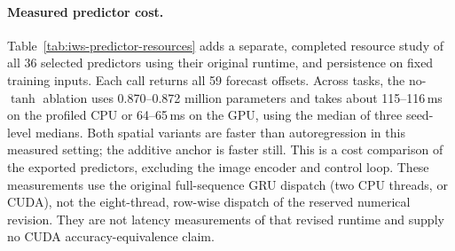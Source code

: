 \begingroup
\let\iwsoriginaltable\table
\renewcommand{\table}[1][]{\iwsoriginaltable[!htbp]}
\let\iwsoriginalfigure\figure
\renewcommand{\figure}[1][]{\iwsoriginalfigure[!htbp]}

\paragraph{Measured predictor cost.}
Table~\ref{tab:iws-predictor-resources} adds a separate, completed resource
study of all 36 selected predictors using their original runtime, and persistence on fixed training
inputs. Each call returns all 59 forecast offsets. Across tasks, the no-$\tanh$
ablation uses 0.870--0.872 million parameters and takes about 115--116\,ms on
the profiled CPU or 64--65\,ms on the GPU, using the median of three
seed-level medians. Both spatial variants are faster than autoregression in
this measured setting; the additive anchor is faster still. This is a cost
comparison of the exported predictors, excluding the image encoder and
control loop. These measurements use the original full-sequence GRU dispatch
(two CPU threads, or CUDA), not the eight-thread, row-wise dispatch of the
reserved numerical revision. They are not latency measurements of that revised
runtime and supply no CUDA accuracy-equivalence claim.

\endgroup
